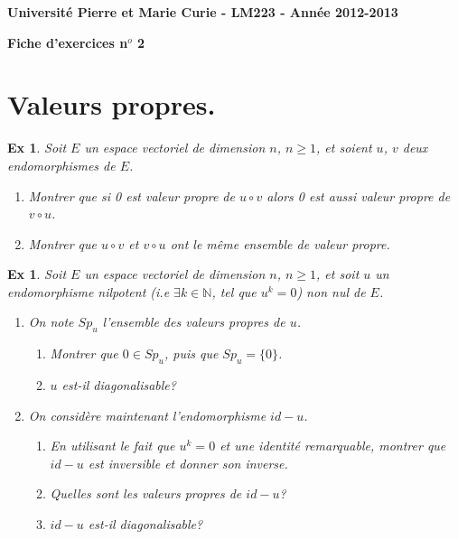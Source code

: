 \documentclass[a4paper,11pt]{article}
\theoremstyle{plain}
\newtheorem{ex}[thm]{Ex}{\theorembodyfont{\upshape}}
\newcommand{\N}{\mathbb{N}}
\begin{document}
\noindent
\large
\textbf{Universit\'e Pierre et Marie Curie 
 - LM223 -
Ann\'ee 2012-2013}\\

\begin{center}
\Large
\textbf{Fiche d'exercices n$^o$ 2}
\end{center}
\normalsize
 \section{Valeurs propres.}



\begin{ex}
Soit $E$ un espace vectoriel de dimension $n$, $n\geq 1$, et soient $u$, $v$ deux endomorphismes de $E$. 
\begin{enumerate}
\item Montrer que si 0 est valeur propre de $u\circ v$ alors 0 est aussi valeur propre de $v\circ u$.
\item Montrer que $u\circ v$  et $v\circ u$ ont le m\^eme ensemble de valeur propre.

\end{enumerate}
\end{ex}

\begin{ex}
Soit $E$ un espace vectoriel de dimension $n$, $n\geq 1$, et soit $u$ un endomorphisme nilpotent (i.e $\exists k\in \N$,
tel que $u^k=0$) non nul de $E$. 
\begin{enumerate}
\item On note $Sp_u$ l'ensemble des valeurs propres de $u$.
\begin{enumerate}
\item Montrer que $0\in Sp_u $, puis que $Sp_u =\lbrace 0\rbrace$.
\item $u$ est-il diagonalisable? 
\end{enumerate}
\item On consid\`ere maintenant l'endomorphisme $id-u$.
\begin{enumerate}
\item En utilisant le fait que $u^k=0$ et une identit\'e remarquable, montrer que $id-u$ est inversible et donner son inverse.
\item Quelles sont les valeurs propres de $id-u$?
\item $id-u$ est-il diagonalisable? 

\end{enumerate}

\end{enumerate}
\end{ex}
\end{document}
